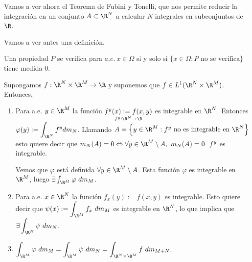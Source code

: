 Vamos a ver ahora el Teorema de Fubini y Tonelli, que nos permite reducir la integración en un
conjunto $A \subset \R^N$ a calcular $N$ integrales en
subconjuntos de $\R$.

Vamos a ver antes una definición.

\begin{ndef}
  Una propiedad $P$ se verifica para $a.e.\ x \in \Omega$ si y solo si $\{ x \in
  \Omega : P \text{ no se verifica} \}$ tiene medida $0$.
\end{ndef}


\begin{nth}
Supongamos $f: \R^N \times \R^M \rightarrow \R$ y suponemos que $f \in L^1(\R^N
\times \R^M)$. Entonces,

\begin{enumerate}
    \item Para a.e. $y \in \R^M$ la función $\underset{  f^y: \R^N \to \R }{f^y(x) := f(x,y)}$ es integrable en $\R^N$. Entonces $\displaystyle \varphi(y) := \int_{\R^N}f^y dm_N$. Llamando $A = \left\{ y \in \R^M : f^y \text{ no es integrable en } \R^N \right\}$ esto quiere decir que $m_N(A) = 0 \Leftrightarrow \forall y \in \R^M \setminus A, \ m_N(A) =0 \ \ f^y$ es integrable.

  Vemos que $\varphi$ está definida $\forall y \in \R^M \setminus A$. Esta función
  $\varphi$ es integrable en $\R^M$, luego $\exists \int_{\R^M} \varphi \ dm_M$.
\item Para a.e. $x \in \R^N$ la función $f_x(y) := f(x,y)$ es integrable. Esto
  quiere decir que $\psi (x) := \displaystyle \int_{\R^M} f_x \ dm_M$ es
  integrable en $\R^N$, lo que implica que $\exists \displaystyle \int_{\R^N}\psi
  \ dm_N$.
\item $\displaystyle\int_{\R^M} \varphi \ dm_M = \displaystyle\int_{\R^M} \psi \ dm_N = \displaystyle\int_{\R^N \times \R^M} f
  \ dm_{M + N}$.
\end{enumerate}
\end{nth}

